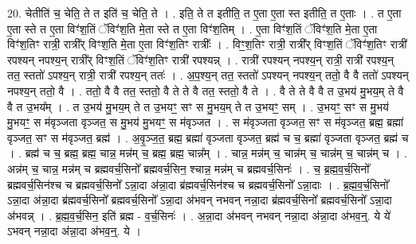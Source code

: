 \documentclass[17pt]{extarticle}
\begin{document}
20. चेतीति॑ च॒ चेति॒ ते त इति॑ च॒ चेति॒ ते । . इति॒ ते त इतीति॒ त ए॒ता ए॒ता स्त इतीति॒ त ए॒ताः । . त ए॒ता ए॒ता स्ते त ए॒ता विꣳ॑श॒तिं ॅविꣳ॑श॒ति मे॒ता स्ते त ए॒ता विꣳ॑श॒तिम् । . ए॒ता विꣳ॑श॒तिं ॅविꣳ॑श॒ति मे॒ता ए॒ता विꣳ॑श॒तिꣳ रात्री॒ रात्री᳚र् विꣳश॒ति मे॒ता ए॒ता विꣳ॑श॒तिꣳ रात्रीः᳚ । . विꣳ॒॒श॒तिꣳ रात्री॒ रात्री᳚र् विꣳश॒तिं ॅविꣳ॑श॒तिꣳ रात्री॑ रपश्यन् नपश्य॒न् रात्री᳚र् विꣳश॒तिं ॅविꣳ॑श॒तिꣳ रात्री॑ रपश्यन्न् । . रात्री॑ रपश्यन् नपश्य॒न् रात्री॒ रात्री॑ रपश्य॒न् तत॒ स्ततो॑ ऽपश्य॒न् रात्री॒ रात्री॑ रपश्य॒न् ततः॑ । . अ॒प॒श्य॒न् तत॒ स्ततो॑ ऽपश्यन् नपश्य॒न् ततो॒ वै वै ततो॑ ऽपश्यन् नपश्य॒न् ततो॒ वै । . ततो॒ वै वै तत॒ स्ततो॒ वै ते ते वै तत॒ स्ततो॒ वै ते । . वै ते ते वै वै त उ॒भय॑ मु॒भय॒म् ते वै वै त उ॒भय᳚म् । . त उ॒भय॑ मु॒भय॒म् ते त उ॒भयꣳ॒॒ सꣳ स मु॒भय॒म् ते त उ॒भयꣳ॒॒ सम् । . उ॒भयꣳ॒॒ सꣳ स मु॒भय॑ मु॒भयꣳ॒॒ स म॑वृञ्जता वृञ्जत॒ स मु॒भय॑ मु॒भयꣳ॒॒ स म॑वृञ्जत । . स म॑वृञ्जता वृञ्जत॒ सꣳ स म॑वृञ्जत॒ ब्रह्म॒ ब्रह्मा॑ वृञ्जत॒ सꣳ स म॑वृञ्जत॒ ब्रह्म॑ । . अ॒वृ॒ञ्ज॒त॒ ब्रह्म॒ ब्रह्मा॑ वृञ्जता वृञ्जत॒ ब्रह्म॑ च च॒ ब्रह्मा॑ वृञ्जता वृञ्जत॒ ब्रह्म॑ च । . ब्रह्म॑ च च॒ ब्रह्म॒ ब्रह्म॒ चान्न॒ मन्न॑म् च॒ ब्रह्म॒ ब्रह्म॒ चान्न᳚म् । . चान्न॒ मन्न॑म् च॒ चान्न॑म् च॒ चान्न॑म् च॒ चान्न॑म् च । . अन्न॑म् च॒ चान्न॒ मन्न॑म् च ब्रह्मवर्च॒सिनो᳚ ब्रह्मवर्च॒सिन॒ श्चान्न॒ मन्न॑म् च ब्रह्मवर्च॒सिनः॑ । . च॒ ब्र॒ह्म॒व॒र्च॒सिनो᳚ ब्रह्मवर्च॒सिन॑श्च च ब्रह्मवर्च॒सिनो᳚ ऽन्ना॒दा अ॑न्ना॒दा ब्र॑ह्मवर्च॒सिन॑श्च च ब्रह्मवर्च॒सिनो᳚ ऽन्ना॒दाः । . ब्र॒ह्म॒व॒र्च॒सिनो᳚ ऽन्ना॒दा अ॑न्ना॒दा ब्र॑ह्मवर्च॒सिनो᳚ ब्रह्मवर्च॒सिनो᳚ ऽन्ना॒दा अ॑भवन् नभवन् नन्ना॒दा ब्र॑ह्मवर्च॒सिनो᳚ ब्रह्मवर्च॒सिनो᳚ ऽन्ना॒दा अ॑भवन्न् । . ब्र॒ह्म॒व॒र्च॒सिन॒ इति॑ ब्रह्म - व॒र्च॒सिनः॑ । . अ॒न्ना॒दा अ॑भवन् नभवन् नन्ना॒दा अ॑न्ना॒दा अ॑भव॒न्॒. ये ये॑ ऽभवन् नन्ना॒दा अ॑न्ना॒दा अ॑भव॒न्॒. ये । \newline
\end{document}
